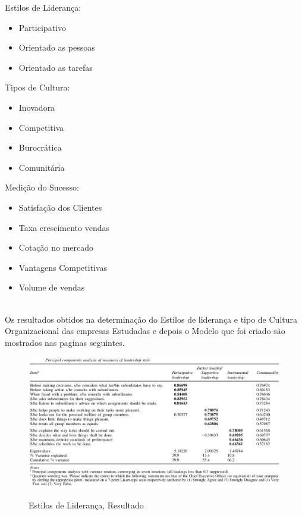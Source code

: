 {\begin{minipage}[t]{.3\linewidth}
\quad Estilos de Liderança:
\begin{itemize}
\item Participativo
\item Orientado as pessoas
\item Orientado as tarefas
\end{itemize}
\end{minipage}
\begin{minipage}[t]{.3\linewidth}
\quad Tipos de Cultura:
\begin{itemize}
\item Inovadora
\item Competitiva
\item Burocrática
\item Comunitária
\end{itemize}
\end{minipage}
\begin{minipage}[t]{.3\linewidth}
\quad Medição do Sucesso:
\begin{itemize}
\item Satisfação dos Clientes
\item Taxa crescimento vendas
\item Cotação no mercado
\item Vantagens Competitivas
\item Volume de vendas
\end{itemize}
\end{minipage}
\vspace{2cm}\\

Os resultados obtidos na determinação do Estilos de liderança e tipo de Cultura Organizacional das empresas Estudadas e depois o Modelo que foi criado são mostrados nas paginas seguintes.\\









\newpage
\begin{figure}[H]
\centering
\includegraphics[scale=.5]{"./image/OB/Leadership.jpg"}\\
\caption{Estilos de Liderança, Resultado}
\label{grafico 1}
\end{figure}\par

}
